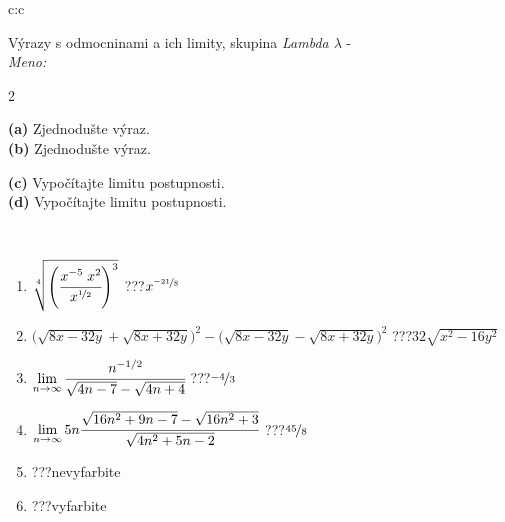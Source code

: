 \documentclass[10pt]{report}
\begin{document}
\begin{tabular}{c:c}
\begin{minipage}[c][104.5mm][t]{0.5\linewidth}
\begin{center}
\vspace{7mm}
{\huge {\Large Výrazy s odmocninami a ich limity}, skupina \textit{Lambda $\lambda$} -}\\[5mm]
\textit{Meno:}\phantom{xxxxxxxxxxxxxxxxxxxxxxxxxxxxxxxxxxxxxxxxxxxxxxxxxxxxxxxxxxxxxxxxx}\\[5mm]
\begin{minipage}{0.95\linewidth}
\begin{center}
{\small \begin{multicols}{2} \raggedright
\phantom{xxxxxxxxx}\textbf{(a)} Zjednodušte výraz. \\[1mm]
\phantom{xxxxxxxxx}\textbf{(b)} Zjednodušte výraz. \par \columnbreak
\textbf{(c)} Vypočítajte limitu postupnosti. \\[1mm]
\textbf{(d)} Vypočítajte limitu postupnosti.
\end{multicols}
}
\end{center}
\end{minipage}
\\[4mm]
\begin{minipage}{0.79\linewidth}
\begin{center}
\begin{varwidth}{\linewidth}
\begin{enumerate}
\small
\item $\sqrt[4]{\left(\cfrac{x^{-5}\;x^{2}}{x^{\nicefrac{1}{2}}}\right)^{3}}$\quad \dotfill\; ???\;\dotfill \quad $x^{\nicefrac{-21}{8}}$
\item {\footnotesize{\scriptsize$\big(\sqrt{8x-32y}+\sqrt{8x+32y}\big)^2-\big(\sqrt{8x-32y}-\sqrt{8x+32y}\big)^2$}\quad \dotfill\; ???\;\dotfill \quad $32\sqrt{x^2-16y^2}$}
\item $\lim\limits_{n\to\infty}\cfrac{n^{-1/2}}{\sqrt{4n-7}-\sqrt{4n+4}}$\quad \dotfill\; ???\;\dotfill \quad $\nicefrac{-4}{3}$
\item $\lim\limits_{n\to\infty}5n\cfrac{\sqrt{16n^2+9n-7}-\sqrt{16n^2+3}}{\sqrt{4n^2+5n-2}}$\quad \dotfill\; ???\;\dotfill \quad $\nicefrac{45}{8}$
\item \quad \dotfill\; ???\;\dotfill \quad nevyfarbite
\item \quad \dotfill\; ???\;\dotfill \quad vyfarbite
\end{enumerate}
\end{varwidth}

\end{center}
\end{minipage}
\end{center}
\end{minipage}
\end{tabular}
\end{document}
